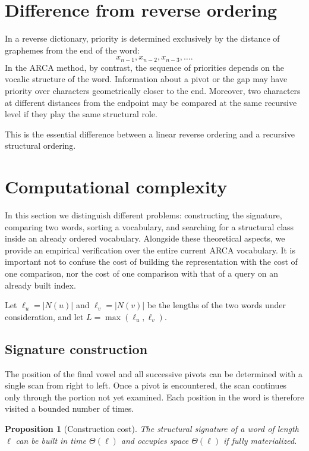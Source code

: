 \documentclass[11pt,a4paper]{article}
\newtheorem{proposition}[theorem]{Proposition}
\theoremstyle{definition}
\theoremstyle{remark}
\newcommand{\Nrm}{N}
\begin{document}
\section{Difference from reverse ordering}

In a reverse dictionary, priority is determined exclusively by the distance of graphemes from the end of the word:
\[
  x_{n-1},x_{n-2},x_{n-3},\dots.
\]
In the ARCA method, by contrast, the sequence of priorities depends on the vocalic structure of the word. Information about a pivot or the gap may have priority over characters geometrically closer to the end. Moreover, two characters at different distances from the endpoint may be compared at the same recursive level if they play the same structural role.

This is the essential difference between a linear reverse ordering and a recursive structural ordering.

\section{Computational complexity}

In this section we distinguish different problems: constructing the signature, comparing two words, sorting a vocabulary, and searching for a structural class inside an already ordered vocabulary. Alongside these theoretical aspects, we provide an empirical verification over the entire current ARCA vocabulary. It is important not to confuse the cost of building the representation with the cost of one comparison, nor the cost of one comparison with that of a query on an already built index.

Let $\ell_u=|\Nrm(u)|$ and $\ell_v=|\Nrm(v)|$ be the lengths of the two words under consideration, and let $L=\max(\ell_u,\ell_v)$.

\subsection{Signature construction}

The position of the final vowel and all successive pivots can be determined with a single scan from right to left. Once a pivot is encountered, the scan continues only through the portion not yet examined. Each position in the word is therefore visited a bounded number of times.

\begin{proposition}[Construction cost]
The structural signature of a word of length $\ell$ can be built in time $\Theta(\ell)$ and occupies space $\Theta(\ell)$ if fully materialized.
\end{proposition}
\end{document}
